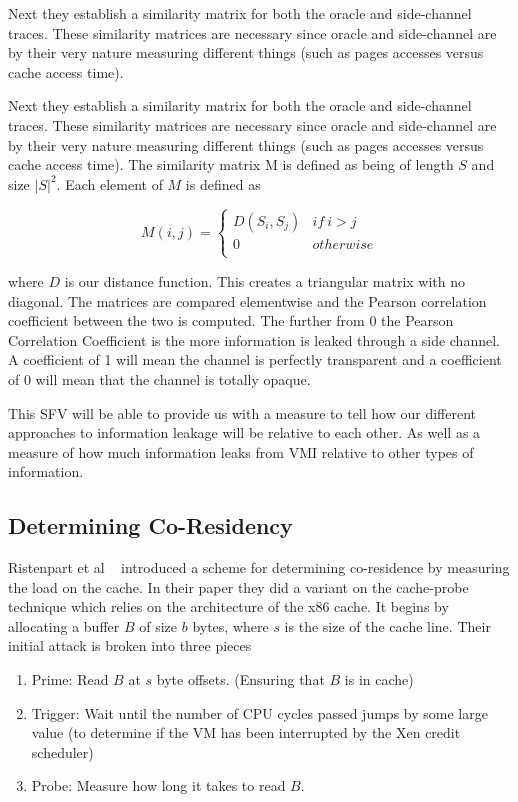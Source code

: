 Next they establish a similarity matrix for both the oracle and side-channel traces. These similarity matrices are necessary since oracle and side-channel are by their very nature measuring different things (such as pages accesses versus cache access time).  

Next they establish a similarity matrix for both the oracle and side-channel traces. These similarity matrices are necessary since oracle and side-channel are by their very nature measuring different things (such as pages accesses versus cache access time).  The similarity matrix M is defined as being of length $S$ and size $|S|^2$.  Each element of $M$ is defined as 




\begin{equation}\label{eqn:simMatrix}
M(i,j) =  
		\begin{cases}
			D(S_i, S_j) & if \ i  >  j \\
			0 & otherwise \\
		  \end{cases}
\end{equation}

where $D$ is our distance function.  This creates a triangular matrix with no diagonal. The matrices are compared elementwise and the Pearson correlation coefficient between the two is computed. The further from 0 the Pearson Correlation Coefficient is the more information is leaked through a side channel. A coefficient of 1 will mean the channel is perfectly transparent and a coefficient of 0 will mean that the channel is totally opaque. 

This SFV will be able to provide us with a measure to tell how our different approaches to information leakage will be relative to each other. As well as a measure of how much information leaks from VMI relative to other types of information.

\subsection{Determining Co-Residency} 
Ristenpart et al ~\cite{ristenpart_hey_2009} introduced a scheme for determining co-residence by measuring the load on the cache. In their paper they did a variant on the cache-probe technique which relies on the architecture of the x86 cache. It begins by allocating a buffer $B$ of size $b$ bytes, where $s$ is the size of the cache line.  Their initial attack is broken into three pieces

\begin{enumerate}
	\item Prime: Read $B$ at $s$ byte offsets. (Ensuring that $B$ is in cache)
	\item Trigger: Wait until the number of CPU cycles passed jumps by some large value (to determine if the VM has been interrupted by the Xen credit scheduler)
	\item Probe: Measure how long it takes to read $B$.
\end{enumerate}

